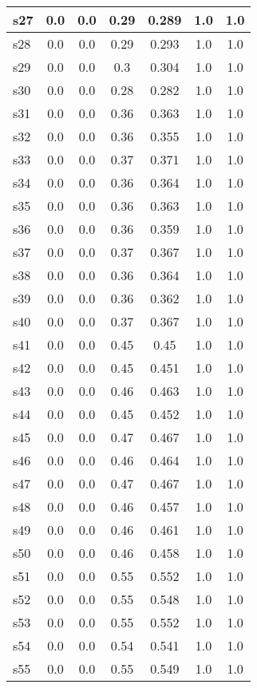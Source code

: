\documentclass{article}
\begin{document}
\begin{tabular}{|l|c|c|c|c|c|c|}
s27 &0.0 & 0.0 & 0.29 & 0.289 & 1.0 & 1.0\\
\hline
s28 &0.0 & 0.0 & 0.29 & 0.293 & 1.0 & 1.0\\
\hline
s29 &0.0 & 0.0 & 0.3 & 0.304 & 1.0 & 1.0\\
\hline
s30 &0.0 & 0.0 & 0.28 & 0.282 & 1.0 & 1.0\\
\hline
s31 &0.0 & 0.0 & 0.36 & 0.363 & 1.0 & 1.0\\
\hline
s32 &0.0 & 0.0 & 0.36 & 0.355 & 1.0 & 1.0\\
\hline
s33 &0.0 & 0.0 & 0.37 & 0.371 & 1.0 & 1.0\\
\hline
s34 &0.0 & 0.0 & 0.36 & 0.364 & 1.0 & 1.0\\
\hline
s35 &0.0 & 0.0 & 0.36 & 0.363 & 1.0 & 1.0\\
\hline
s36 &0.0 & 0.0 & 0.36 & 0.359 & 1.0 & 1.0\\
\hline
s37 &0.0 & 0.0 & 0.37 & 0.367 & 1.0 & 1.0\\
\hline
s38 &0.0 & 0.0 & 0.36 & 0.364 & 1.0 & 1.0\\
\hline
s39 &0.0 & 0.0 & 0.36 & 0.362 & 1.0 & 1.0\\
\hline
s40 &0.0 & 0.0 & 0.37 & 0.367 & 1.0 & 1.0\\
\hline
s41 &0.0 & 0.0 & 0.45 & 0.45 & 1.0 & 1.0\\
\hline
s42 &0.0 & 0.0 & 0.45 & 0.451 & 1.0 & 1.0\\
\hline
s43 &0.0 & 0.0 & 0.46 & 0.463 & 1.0 & 1.0\\
\hline
s44 &0.0 & 0.0 & 0.45 & 0.452 & 1.0 & 1.0\\
\hline
s45 &0.0 & 0.0 & 0.47 & 0.467 & 1.0 & 1.0\\
\hline
s46 &0.0 & 0.0 & 0.46 & 0.464 & 1.0 & 1.0\\
\hline
s47 &0.0 & 0.0 & 0.47 & 0.467 & 1.0 & 1.0\\
\hline
s48 &0.0 & 0.0 & 0.46 & 0.457 & 1.0 & 1.0\\
\hline
s49 &0.0 & 0.0 & 0.46 & 0.461 & 1.0 & 1.0\\
\hline
s50 &0.0 & 0.0 & 0.46 & 0.458 & 1.0 & 1.0\\
\hline
s51 &0.0 & 0.0 & 0.55 & 0.552 & 1.0 & 1.0\\
\hline
s52 &0.0 & 0.0 & 0.55 & 0.548 & 1.0 & 1.0\\
\hline
s53 &0.0 & 0.0 & 0.55 & 0.552 & 1.0 & 1.0\\
\hline
s54 &0.0 & 0.0 & 0.54 & 0.541 & 1.0 & 1.0\\
\hline
s55 &0.0 & 0.0 & 0.55 & 0.549 & 1.0 & 1.0\\

\end{tabular}
\end{document}
